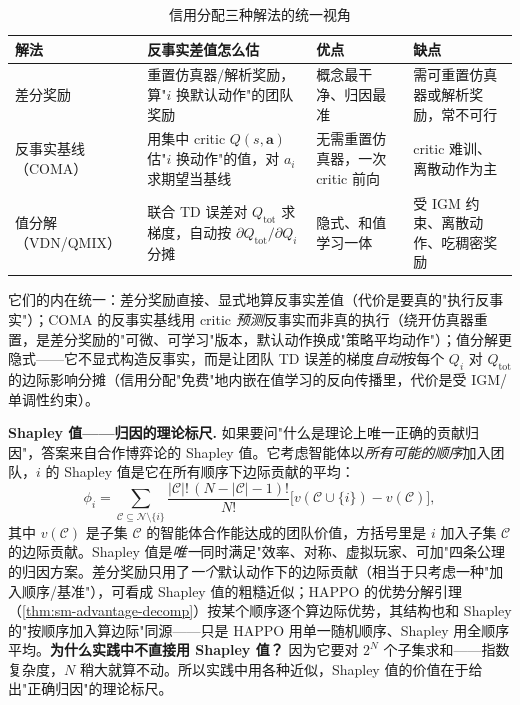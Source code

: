 \begin{table}[H]\centering\small
\caption{信用分配三种解法的统一视角}
\label{tab:sm-credit}
\begin{tabular}{p{} p{} p{} p{}}
\toprule
解法 & 反事实差值怎么估 & 优点 & 缺点 \\
\midrule
差分奖励 & 重置仿真器/解析奖励，算"$i$ 换默认动作"的团队奖励 & 概念最干净、归因最准 & 需可重置仿真器或解析奖励，常不可行 \\
反事实基线（COMA） & 用集中 critic $Q(s,\mathbf{a})$ 估"$i$ 换动作"的值，对 $a_i$ 求期望当基线 & 无需重置仿真器，一次 critic 前向 & critic 难训、离散动作为主 \\
值分解（VDN/QMIX） & 联合 TD 误差对 $Q_{\text{tot}}$ 求梯度，自动按 $\partial Q_{\text{tot}}/\partial Q_i$ 分摊 & 隐式、和值学习一体 & 受 IGM 约束、离散动作、吃稠密奖励 \\
\bottomrule
\end{tabular}
\end{table}

它们的内在统一：差分奖励直接、显式地算反事实差值（代价是要真的"执行反事实"）；COMA 的反事实基线用 critic \emph{预测}反事实而非真的执行（绕开仿真器重置，是差分奖励的"可微、可学习"版本，默认动作换成"策略平均动作"）；值分解更隐式——它不显式构造反事实，而是让团队 TD 误差的梯度\emph{自动}按每个 $Q_i$ 对 $Q_{\text{tot}}$ 的边际影响分摊（信用分配"免费"地内嵌在值学习的反向传播里，代价是受 IGM/单调性约束）。

\textbf{Shapley 值——归因的理论标尺.} 如果要问"什么是理论上唯一正确的贡献归因"，答案来自合作博弈论的 Shapley 值。它考虑智能体以\emph{所有可能的顺序}加入团队，$i$ 的 Shapley 值是它在所有顺序下边际贡献的平均：
\begin{equation}
  \phi_i=\sum_{\mathcal{C}\subseteq\mathcal{N}\setminus\{i\}}\frac{|\mathcal{C}|!\,(N-|\mathcal{C}|-1)!}{N!}\big[v(\mathcal{C}\cup\{i\})-v(\mathcal{C})\big],
  \label{eq:sm-shapley}
\end{equation}
其中 $v(\mathcal{C})$ 是子集 $\mathcal{C}$ 的智能体合作能达成的团队价值，方括号里是 $i$ 加入子集 $\mathcal{C}$ 的边际贡献。Shapley 值是\emph{唯一}同时满足"效率、对称、虚拟玩家、可加"四条公理的归因方案。差分奖励只用了\emph{一个}默认动作下的边际贡献（相当于只考虑一种"加入顺序/基准"），可看成 Shapley 值的粗糙近似；HAPPO 的优势分解引理（\cref{thm:sm-advantage-decomp}）按某个顺序逐个算边际优势，其结构也和 Shapley 的"按顺序加入算边际"同源——只是 HAPPO 用单一随机顺序、Shapley 用全顺序平均。\textbf{为什么实践中不直接用 Shapley 值？} 因为它要对 $2^N$ 个子集求和——指数复杂度，$N$ 稍大就算不动。所以实践中用各种近似，Shapley 值的价值在于给出"正确归因"的理论标尺。

